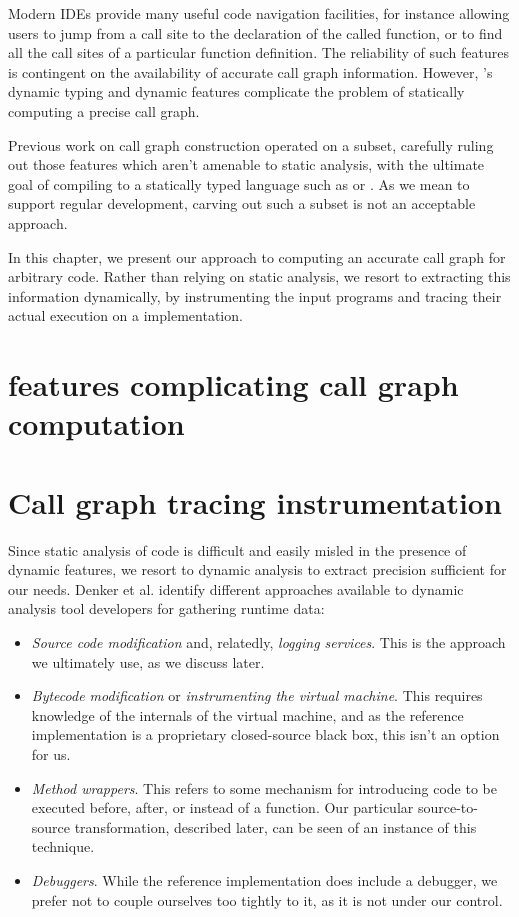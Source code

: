 Modern IDEs provide many useful code navigation facilities, for instance
allowing users to jump from a call site to the declaration of the called
function, or to find all the call sites of a particular function definition.
The reliability of such features is contingent on the availability of accurate
call graph information. However, \matlab's dynamic typing and dynamic features
complicate the problem of statically computing a precise call graph.

Previous work on \matlab call graph construction operated on a \matlab subset,
carefully ruling out those features which aren't amenable to static analysis,
with the ultimate goal of compiling \matlab to a statically typed language such
as \fortran or \xten \cite{Tamer}. As we mean to support regular \matlab
development, carving out such a subset is not an acceptable approach.

In this chapter, we present our approach to computing an accurate call graph
for arbitrary \matlab code. Rather than relying on static analysis, we resort
to extracting this information dynamically, by instrumenting the input programs
and tracing their actual execution on a \matlab implementation.

\section{\matlab features complicating call graph computation}

\section{Call graph tracing instrumentation}

Since static analysis of \matlab code is difficult and easily misled in the
presence of dynamic features, we resort to dynamic analysis to extract
precision sufficient for our needs. Denker et al.
\cite{AbstractionsForDynamicAnalysis} identify different approaches available
to dynamic analysis tool developers for gathering runtime data:

\begin{itemize}
\item \emph{Source code modification} and, relatedly, \emph{logging services}.
This is the approach we ultimately use, as we discuss later.
\item \emph{Bytecode modification} or \emph{instrumenting the virtual machine}.
This requires knowledge of the internals of the \matlab virtual machine, and as
the reference \matlab implementation is a proprietary closed-source black box,
this isn't an option for us.
\item \emph{Method wrappers}. This refers to some mechanism for introducing
code to be executed before, after, or instead of a function. Our particular
source-to-source transformation, described later, can be seen of an instance of
this technique.
\item \emph{Debuggers}. While the reference \matlab implementation does include
a debugger, we prefer not to couple ourselves too tightly to it, as it is not
under our control.
\end{itemize}

